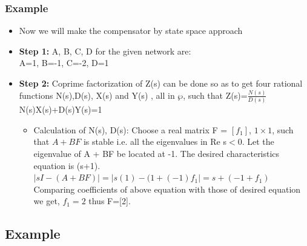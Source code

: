\documentclass{beamer}
\begin{document}
\begin{frame}
\frametitle{Example}
\begin{small}

        \begin{itemize}
\item Now we will make the compensator by state space approach\cite{Chua}
\item {\bf{Step 1:}} A, B, C, D for the given network are:\\
A=1, B=-1, C=-2, D=1
\item {\bf{Step 2:}} Coprime factorization of Z(s) can be done so as to get four rational functions N(s),D(s), X(s) and Y(s) \cite{Chua}, all in $\wp$, such that Z(s)=$ \frac{N(s)}{D(s)} $\\
N(s)X(s)+D(s)Y(s)=1

\begin{itemize}
      \item Calculation of N(s), D(s): Choose a real matrix F = $[f_1]$, $ 1\times 1$, such that $A + BF$ is stable i.e. all the eigenvalues in Re s$<$0. Let the eigenvalue of A + BF be located at -1. The desired characteristics equation is (s+1).\\
                $|sI-(A+BF)| =|s(1)-(1+(-1)f_1|=s+(-1+f_1)$\\
Comparing coefficients of above equation with those of desired equation we get, $f_1=2$ thus F=[2].

 \end{itemize}
\end{itemize}
\end{small}
\let\thefootnote\relax{}
\end{frame}





\subsection*{Example}
\end{document}
